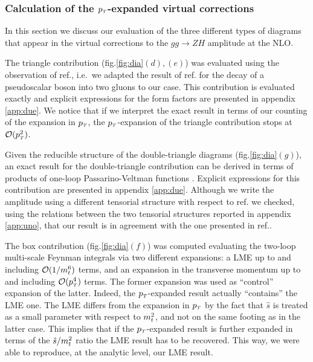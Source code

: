 \subsubsection{Calculation of the $p_{\scriptscriptstyle T}$-expanded virtual corrections}
In this section we discuss our evaluation of the three different types of
diagrams that appear in the virtual corrections to the $gg \to ZH$ amplitude
at the NLO.

The triangle contribution (fig.\ref{fig:dia}$(d),(e)$) was evaluated using the
observation of  ref.\cite{Altenkamp:2012sx}, i.e.~we adapted
the result of ref.\cite{Aglietti:2006tp} for the decay of a
pseudoscalar boson into two gluons  to our case. This contribution is evaluated
exactly and explicit expressions for the form factors are presented in
appendix \ref{app:due}. We notice that if we interpret the exact result
in terms of our counting of the expansion in $p_{\scriptscriptstyle T}$, the $p_{\scriptscriptstyle T}$-expansion of the triangle contribution stops at ${\cal O}(p_{\scriptscriptstyle T}^2)$.

Given the reducible structure of the double-triangle diagrams
(fig.\ref{fig:dia}$(g)$), an exact result for the double-triangle contribution
can be derived in terms of products of one-loop Passarino-Veltman functions
\cite{Passarino:1978jh}.     
Explicit expressions for this contribution are presented in
appendix \ref{app:due}. Although we write the amplitude using a different
tensorial structure with respect to ref.\cite{Davies:2020drs} we checked,
using the relations between the two tensorial structures reported in appendix
\ref{app:uno}, that our result is in agreement with the one presented
in ref.\cite{Hasselhuhn:2016rqt}.

The box contribution (fig.\ref{fig:dia}$(f)$) was computed evaluating
the two-loop multi-scale Feynman integrals via two different expansions:
a LME up to and including $\mathcal{O}(1/m_t^6)$ terms, and  an
expansion in the transverse momentum up to and including
${\cal O}(p_{\scriptscriptstyle T}^4)$ terms.
The former expansion was used as ``control'' expansion of the latter.
Indeed, the $p_{\scriptscriptstyle T}$-expanded result actually ``contains'' the LME one. The LME
differs from the expansion in $p_{\scriptscriptstyle T}$ by the fact that $\hat{s}$ is
treated as a small parameter with respect to $m_t^2$, and not on the same
footing as in the latter case. This implies that if the $p_{\scriptscriptstyle T}$-expanded result is
further expanded in terms of the  $\hat{s}/m_t^2$ ratio the LME result has to
be recovered. This way, we were able to reproduce, at the analytic level,
our LME result. 


